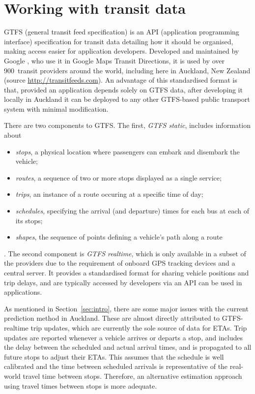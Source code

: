 \section{Working with \rt transit data}
\label{sec:gtfs}

GTFS (general transit feed specification)
is an API (application programming interface) specification for transit data
detailing how it should be organised,
making access easier for application developers.
Developed and maintained by Google \citep{GoogleDevelopers_2006},
who use it in Google Maps Transit Directions,
it is used by over 900~transit providers around the world,
including here in Auckland, New Zealand
(source \url{http://transitfeeds.com}).
An advantage of this standardised format is that,
provided an application depends solely on GTFS data,
after developing it locally in Auckland it can be deployed to any other GTFS-based
public transport system with minimal modification.


There are two components to GTFS.
The first, \emph{GTFS static}, includes information about
\begin{itemize}
\item \emph{stops}, a physical location where passengers can embark and disembark the vehicle;
\item \emph{routes}, a sequence of two or more stops displayed as a single service;
\item \emph{trips}, an instance of a route occuring at a specific time of day;
\item \emph{schedules}, specifying the arrival (and departure) times for each bus at each of its stops; 
\item \emph{shapes}, the sequence of points defining a vehicle's path along a route
\end{itemize}
\citep{GoogleDevelopers_2006}.
The second component is \emph{GTFS realtime},
which is only available in a subset of the providers due to the requirement of 
onboard GPS tracking devices and a central server.
It provides a standardised format for sharing vehicle positions and trip delays,
and are typically accessed by developers via an API can be used in \rt applications.

As mentioned in Section~\ref{sec:intro},
there are some major issues with the current prediction method in Auckland.
These are almost directly attributed to GTFS-realtime trip updates,
which are currently the sole source of data for ETAs.
Trip updates are reported whenever a vehicle arrives or departs a stop,
and includes the delay between the scheduled and actual arrival times,
and is propagated to all future stops to adjust their ETAs.
This assumes that the schedule is well calibrated and the time between scheduled arrivals
is representative of the real-world travel time between stops. 
Therefore, an alternative estimation approach using \rt travel times 
between stops is more adequate.



